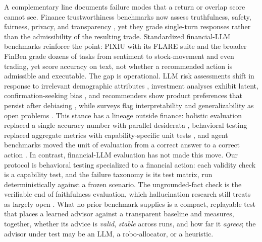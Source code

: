 \documentclass[sigconf,review,anonymous]{acmart}
\begin{document}
A complementary line documents failure modes that a return or overlap score cannot see. Finance trustworthiness benchmarks now assess truthfulness, safety, fairness, privacy, and transparency \cite{hu2025fintrust}, yet they grade single-turn responses rather than the admissibility of the resulting trade. Standardized financial-LLM benchmarks reinforce the point: PIXIU with its FLARE suite \cite{xie2023pixiu} and the broader FinBen \cite{xie2024finben} grade dozens of tasks from sentiment to stock-movement and even trading, yet score accuracy on text, not whether a recommended action is admissible and executable. The gap is operational. LLM risk assessments shift in response to irrelevant demographic attributes \cite{chawla2025riskadvice}, investment analyses exhibit latent, confirmation-seeking bias \cite{lee2025bias}, and recommenders show product preferences that persist after debiasing \cite{zhi2025productbias}, while surveys flag interpretability and generalizability as open problems \cite{elalami2025mlfinance}. This stance has a lineage outside finance: holistic evaluation replaced a single accuracy number with parallel desiderata \cite{liang2023helm}, behavioral testing replaced aggregate metrics with capability-specific unit tests \cite{ribeiro2020checklist}, and agent benchmarks moved the unit of evaluation from a correct answer to a correct action \cite{liu2024agentbench, jimenez2024swebench}. In contrast, financial-LLM evaluation has not made this move. Our protocol is behavioral testing specialized to a financial action: each validity check is a capability test, and the failure taxonomy is its test matrix, run deterministically against a frozen scenario. The ungrounded-fact check is the verifiable end of faithfulness evaluation, which hallucination research still treats as largely open \cite{ji2023hallucination}. What no prior benchmark supplies is a compact, replayable test that places a learned advisor against a transparent baseline and measures, together, whether its advice is \emph{valid}, \emph{stable} across runs, and how far it \emph{agrees}; the advisor under test may be an LLM, a robo-allocator, or a heuristic.
\end{document}
